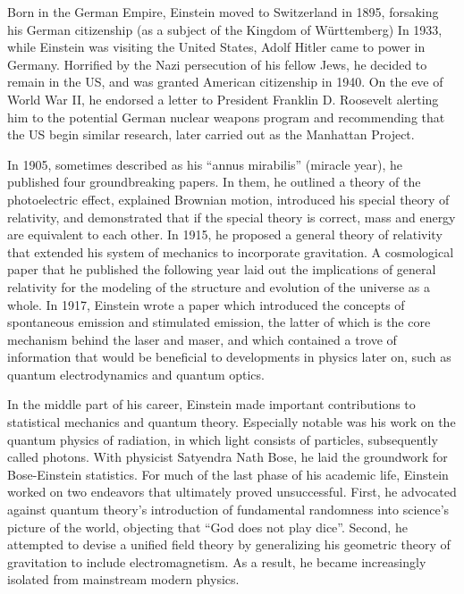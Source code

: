 \documentclass[twoside]{memoir}
\begin{document}
Born in the German Empire, Einstein moved to Switzerland in 1895, forsaking his German citizenship (as a subject of the Kingdom of Württemberg) In 1933,  while Einstein was visiting the United States, Adolf Hitler came to power in Germany. Horrified by the Nazi persecution of his fellow Jews,\cite{zE9Bz} he decided to remain in the US, and was granted American citizenship in 1940.  On the eve of World War II,  he endorsed a letter to President Franklin D. Roosevelt alerting him to the potential German nuclear weapons program and recommending that the US begin similar research, later carried out as the Manhattan Project.

In 1905, sometimes described as his \enquote{annus mirabilis}  (miracle year), he published four groundbreaking papers. In them, he outlined a theory of the photoelectric effect, explained Brownian motion, introduced his special theory of relativity, and demonstrated that if the special theory is correct, mass and energy are equivalent to each other. In 1915,  he proposed a general theory of relativity that extended his system of mechanics to incorporate gravitation. A cosmological paper that he published the following year laid out the implications of general relativity for the modeling of the structure and evolution of the universe as a whole.\cite{Nobel} In 1917, Einstein wrote a paper which introduced the concepts of spontaneous emission and stimulated emission, the latter of which is the core mechanism behind the laser and maser, and which contained a trove of information that would be beneficial to developments in physics later on, such as quantum electrodynamics and quantum optics.\cite{Kleppner_2005}

In the middle part of his career, Einstein made important contributions to statistical mechanics and quantum theory. Especially notable was his work on the quantum physics of radiation,  in which light consists of particles, subsequently called photons. With physicist Satyendra Nath Bose, he laid the groundwork for Bose-Einstein statistics. For much of the last phase of his academic life, Einstein worked on two endeavors that ultimately proved unsuccessful. First, he advocated against quantum theory's introduction of fundamental randomness into science's picture of the world, objecting that \enquote{God does not play dice}.\cite{Robinson_2018} Second, he attempted to devise a unified field theory by generalizing his geometric theory of gravitation to include electromagnetism. As a result, he became increasingly isolated from mainstream modern physics.
\end{document}
